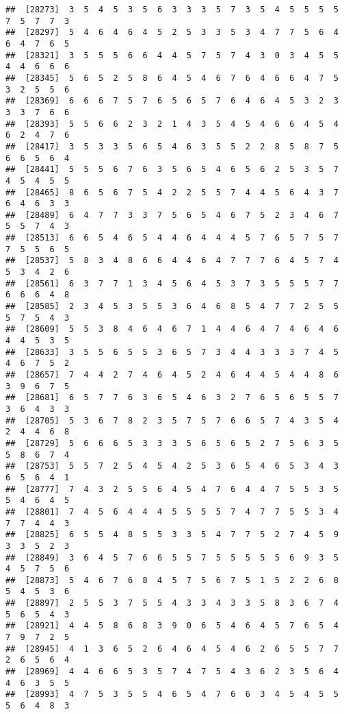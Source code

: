 \documentclass[
]{book}
\begin{document}
\begin{verbatim}
##  [28273]  3  5  4  5  3  5  6  3  3  3  5  7  3  5  4  5  5  5  5  7  5  7  7  3
##  [28297]  5  4  6  4  6  4  5  2  5  3  3  5  3  4  7  7  5  6  4  6  4  7  6  5
##  [28321]  3  5  5  5  6  6  4  4  5  7  5  7  4  3  0  3  4  5  5  4  4  6  6  6
##  [28345]  5  6  5  2  5  8  6  4  5  4  6  7  6  4  6  6  4  7  5  3  2  5  5  6
##  [28369]  6  6  6  7  5  7  6  5  6  5  7  6  4  6  4  5  3  2  3  3  3  7  6  6
##  [28393]  5  5  6  6  2  3  2  1  4  3  5  4  5  4  6  6  4  5  4  6  2  4  7  6
##  [28417]  3  5  3  3  5  6  5  4  6  3  5  5  2  2  8  5  8  7  5  6  6  5  6  4
##  [28441]  5  5  5  6  7  6  3  5  6  5  4  6  5  6  2  5  3  5  7  4  5  4  5  5
##  [28465]  8  6  5  6  7  5  4  2  2  5  5  7  4  4  5  6  4  3  7  6  4  6  3  3
##  [28489]  6  4  7  7  3  3  7  5  6  5  4  6  7  5  2  3  4  6  7  5  5  7  4  3
##  [28513]  6  6  5  4  6  5  4  4  6  4  4  4  5  7  6  5  7  5  7  7  5  5  6  5
##  [28537]  5  8  3  4  8  6  6  4  4  6  4  7  7  7  6  4  5  7  4  5  3  4  2  6
##  [28561]  6  3  7  7  1  3  4  5  6  4  5  3  7  3  5  5  5  7  7  6  6  6  4  8
##  [28585]  2  3  4  5  3  5  5  3  6  4  6  8  5  4  7  7  2  5  5  5  7  5  4  3
##  [28609]  5  5  3  8  4  6  4  6  7  1  4  4  6  4  7  4  6  4  6  4  4  5  3  5
##  [28633]  3  5  5  6  5  5  3  6  5  7  3  4  4  3  3  3  7  4  5  4  6  7  5  2
##  [28657]  7  4  4  2  7  4  6  4  5  2  4  6  4  4  5  4  4  8  6  3  9  6  7  5
##  [28681]  6  5  7  7  6  3  6  5  4  6  3  2  7  6  5  6  5  5  7  3  6  4  3  3
##  [28705]  5  3  6  7  8  2  3  5  7  5  7  6  6  5  7  4  3  5  4  2  4  4  6  8
##  [28729]  5  6  6  6  5  3  3  3  5  6  5  6  5  2  7  5  6  3  5  5  8  6  7  4
##  [28753]  5  5  7  2  5  4  5  4  2  5  3  6  5  4  6  5  3  4  3  6  5  6  4  1
##  [28777]  7  4  3  2  5  5  6  4  5  4  7  6  4  4  7  5  5  3  5  5  4  6  4  5
##  [28801]  7  4  5  6  4  4  4  5  5  5  5  7  4  7  7  5  5  3  4  7  7  4  4  3
##  [28825]  6  5  5  4  8  5  5  3  3  5  4  7  7  5  2  7  4  5  9  3  3  5  2  3
##  [28849]  3  6  4  5  7  6  6  5  5  7  5  5  5  5  5  6  9  3  5  4  5  7  5  6
##  [28873]  5  4  6  7  6  8  4  5  7  5  6  7  5  1  5  2  2  6  8  5  4  5  3  6
##  [28897]  2  5  5  3  7  5  5  4  3  3  4  3  3  5  8  3  6  7  4  5  6  5  4  3
##  [28921]  4  4  5  8  6  8  3  9  0  6  5  4  6  4  5  7  6  5  4  7  9  7  2  5
##  [28945]  4  1  3  6  5  2  6  4  6  4  5  4  6  2  6  5  5  7  7  2  6  5  6  4
##  [28969]  4  4  6  6  5  3  5  7  4  7  5  4  3  6  2  3  5  6  4  4  6  3  5  5
##  [28993]  4  7  5  3  5  5  4  6  5  4  7  6  6  3  4  5  4  5  5  5  6  4  8  3

\end{verbatim}
\end{document}
